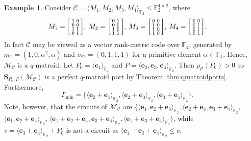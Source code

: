 \documentclass[onecolumn,draftclsnofoot,12pt]{IEEEtran}
\newcommand{\F}{\mathbb{F}}
\newcommand{\C}{\mathcal{C}}
\newcommand{\M}{\mathcal{M}}
\theoremstyle{plain} %
\theoremstyle{definition}
\newtheorem{example}[theorem]{Example}
\begin{document}
\begin{example} \label{exmp:circuitminimal}
Consider $\mathcal{C} = \langle M_1,M_2,M_3,M_4\rangle_{\mathbb{F}_2}\leq \F_2^{4\times 2}$, where
\[ M_1 =
\begin{bsmallmatrix}
    1 & 0 \\
    0 & 0 \\
    1 & 1 \\
    0 & 1 \\
\end{bsmallmatrix},\:
M_2 =
\begin{bsmallmatrix}
    0 & 1 \\
    0 & 0 \\
    1 & 0 \\
    1 & 1 \\
\end{bsmallmatrix},\:
M_3 =
\begin{bsmallmatrix}
    0 & 0 \\
    1 & 0 \\
    1 & 0 \\
    1 & 0 \\
\end{bsmallmatrix},\:
M_4 =
\begin{bsmallmatrix}
    0 & 0 \\
    0 & 1 \\
    0 & 1 \\
    0 & 1 \\
\end{bsmallmatrix}.
\]
In fact $\C$ may be viewed as a vector rank-metric code over $\F_4$, generated by $m_1 = (1,0,\alpha^2,\alpha)$ and $m_2=(0,1,1,1)$ for a primitive element $\alpha \in \F_4$. Hence, $\M_\C$ is a $q$-matroid.
Let $P_0 = \langle \mathbf{e}_1 \rangle_{\mathbb{F}_2}$ and $P = \langle \mathbf{e}_2,\mathbf{e}_3,\mathbf{e}_4\rangle_{\mathbb{F}_2} $. Then $\rho_{\mathcal{C}}(P_0)>0$ so $\mathbf{S}_{P_0,P}(\mathcal{M}_{\mathcal{C}})$ is a perfect $q$-matroid port by Theorem \ref{thm:qmatroidports}. Furthermore, 
\[
    \Gamma_{\min} = \{\langle  \mathbf{e}_2+\mathbf{e}_4 \rangle_{\mathbb{F}_2},
    \langle  \mathbf{e}_2+\mathbf{e}_3 \rangle_{\mathbb{F}_2},
\langle  \mathbf{e}_3+\mathbf{e}_4 \rangle_{\mathbb{F}_2}
\}.
\]
Note, however, that the circuits of $\mathcal{M}_{\mathcal{C}}$ are $\{\langle\mathbf{e}_1, \mathbf{e}_2+\mathbf{e}_3 \rangle_{\mathbb{F}_2},\langle \mathbf{e}_2+\mathbf{e}_4,\mathbf{e}_3+\mathbf{e}_4 \rangle_{\mathbb{F}_2},$ $\langle\mathbf{e}_1,\mathbf{e}_2+\mathbf{e}_4 \rangle_{\mathbb{F}_2}$, $\langle \mathbf{e}_1+\mathbf{e}_2+\mathbf{e}_4,\mathbf{e}_3+\mathbf{e}_4 \rangle_{\mathbb{F}_2},\langle\mathbf{e}_1+\mathbf{e}_3+\mathbf{e}_4 \rangle_{\mathbb{F}_2}\}$, while $v =\langle \mathbf{e}_3+\mathbf{e}_4 \rangle_{\mathbb{F}_2} + P_0$ is not a circuit as $\langle \mathbf{e}_1+\mathbf{e}_3+\mathbf{e}_4 \rangle_{\mathbb{F}_2}\leq v$.
\end{example}
\end{document}
